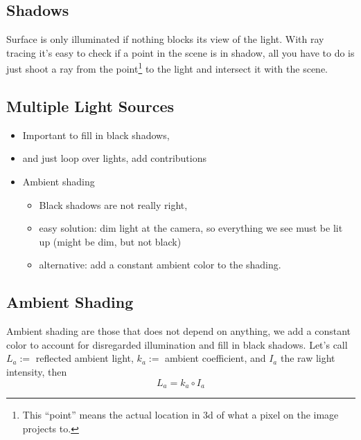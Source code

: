 \documentclass[11pt]{article}
\begin{document}
\subsection{Shadows}
Surface is only illuminated if nothing blocks its view of the light. With ray tracing it's easy to check if a point in the scene is in shadow, all you have to do is just shoot a ray from the point\footnote{This ``point'' means the actual location in 3d of what a pixel on the image projects to. } to the light and intersect it with the scene.

\subsection{Multiple Light Sources}
\begin{itemize}
	\item Important to fill in black shadows, 
	\item and just loop over lights, add contributions
	\item Ambient shading
	\begin{itemize}
		\item Black shadows are not really right, 
		\item easy solution: dim light at the camera, so everything we see must  be lit up (might be dim, but not black)
		\item alternative: add a constant ambient color to the shading. 
	\end{itemize}
\end{itemize}

\subsection{Ambient Shading}
Ambient shading are those that does not depend on anything, we add a constant color to account for disregarded illumination and fill in black shadows. Let's call $L_a:=$ reflected ambient light, $k_a:=$ ambient coefficient, and $I_a$ the raw light intensity, then
\begin{equation}
	L_a = k_a \circ I_a
\end{equation}
\end{document}
